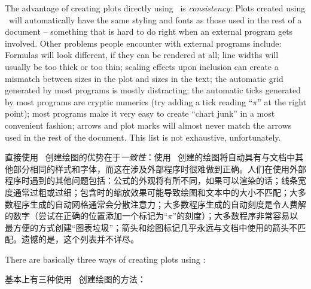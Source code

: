 The advantage of creating plots directly using \tikzname\ is
\emph{consistency:} Plots created using \tikzname\ will automatically have the
same styling and fonts as those used in the rest of a document -- something
that is hard to do right when an external program gets involved. Other problems
people encounter with external programs include: Formulas will look different,
if they can be rendered at all; line widths will usually be too thick or too
thin; scaling effects upon inclusion can create a mismatch between sizes in the
plot and sizes in the text; the automatic grid generated by most programs is
mostly distracting; the automatic ticks generated by most programs are cryptic
numerics (try adding a tick reading ``$\pi$'' at the right point); most
programs make it very easy to create ``chart junk'' in a most convenient
fashion; arrows and plot marks will almost never match the arrows used in the
rest of the document. This list is not exhaustive, unfortunately.

直接使用 \tikzname\ 创建绘图的优势在于\emph{一致性}：使用 \tikzname\ 创建的绘图将自动具有与文档中其他部分相同的样式和字体，而这在涉及外部程序时很难做到正确。人们在使用外部程序时遇到的其他问题包括：公式的外观将有所不同，如果可以渲染的话；线条宽度通常过粗或过细；包含时的缩放效果可能导致绘图和文本中的大小不匹配；大多数程序生成的自动网格通常会分散注意力；大多数程序生成的自动刻度是令人费解的数字（尝试在正确的位置添加一个标记为“$\pi$”的刻度）；大多数程序非常容易以最方便的方式创建“图表垃圾”；箭头和绘图标记几乎永远与文档中使用的箭头不匹配。遗憾的是，这个列表并不详尽。

There are basically three ways of creating plots using \tikzname:

基本上有三种使用 \tikzname\ 创建绘图的方法：


